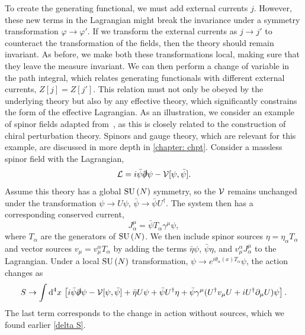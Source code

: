 To create the generating functional, we must add external currents $j$.
However, these new terms in the Lagrangian might break the invariance under a symmetry transformation $\varphi \rightarrow \varphi'$.
If we transform the external currents as $j \rightarrow j'$ to counteract the transformation of the fields, then the theory should remain invariant.
As before, we make both these transformations local, making sure that they leave the measure invariant.
We can then perform a change of variable in the path integral, which relates generating functionals with different external currents, $Z[j] = Z[j']$.
This relation must not only be obeyed by the underlying theory but also by any effective theory, which significantly constrains the form of the effective Lagrangian.
As an illustration, we consider an example of spinor fields adapted from~\autocite{schererIntroductionChiralPerturbation2002}, as this is closely related to the construction of chiral perturbation theory.
Spinors and gauge theory, which are relevant for this example, are discussed in more depth in \autoref{chapter: chpt}.
Consider a massless spinor field with the Lagrangian,
%
\begin{equation}
    \mathcal L = i \bar \psi \slashed \partial \psi - \mathcal V[\psi, \bar \psi].
\end{equation}
%
Assume this theory has a global $\text{SU}\left(N\right)$ symmetry, so the $\mathcal V$ remains unchanged under the transformation $\psi \rightarrow U \psi$, $\bar \psi \rightarrow \bar \psi U^\dagger$.
The system then has a corresponding conserved current,
%
\begin{equation}
    J_\alpha^\mu = \bar \psi T_\alpha \gamma^\mu \psi,
\end{equation}
%
where $T_\alpha$ are the generators of $\text{SU}\left(N\right)$.
We then include spinor sources $\eta = \eta_\alpha T_\alpha$ and vector sources $v_\mu = v_\mu^\alpha T_\alpha$ by adding the terms $ \bar \eta \psi$, $\bar \psi \eta$, and $v_\mu^\alpha J^\mu_\alpha$ to the Lagrangian.
Under a local $\text{SU}\left(N\right)$ transformation, $\psi \rightarrow e^{i\theta_\alpha(x)T_\alpha} \psi$, the action changes as
%
\begin{equation}
    S \rightarrow 
    \int \mathrm{d}^4 x \,
    \left[
        i \bar \psi \slashed \partial \psi 
        - \mathcal V[\psi, \bar \psi]
        + \bar \eta U \psi
        + \bar \psi U^\dagger \eta 
        + \bar \psi \gamma^\mu (U^\dagger v_\mu U + i U^\dagger \partial_\mu U)\psi
    \right].
\end{equation}
%
The last term corresponds to the change in action without sources, which we found earlier \autoref{delta S}.
